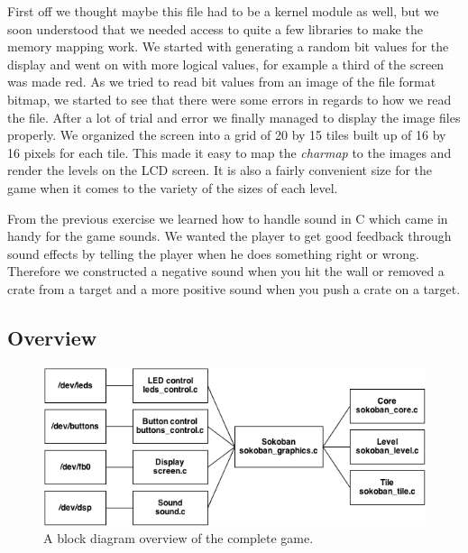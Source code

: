 \documentclass[a4paper,11pt]{article}
\begin{document}
First off we thought maybe this file had to be a kernel module as well, but we soon understood that we needed access to quite a few libraries to make the memory mapping work. We started with generating a random bit values for the display and went on with more logical values, for example a third of the screen was made red. As we tried to read bit values from an image of the file format bitmap, we started to see that there were some errors in regards to how we read the file. After a lot of trial and error we finally managed to display the image files properly. We organized the screen into a grid of 20 by 15 tiles built up of 16 by 16 pixels for each tile. This made it easy to map the \textit{charmap} to the images and render the levels on the LCD screen. It is also a fairly convenient size for the game when it comes to the variety of the sizes of each level.

From the previous exercise we learned how to handle sound in C which came in handy for the game sounds. We wanted the player to get good feedback through sound effects by telling the player when he does something right or wrong. Therefore we constructed a negative sound when you hit the wall or removed a crate from a target and a more positive sound when you push a crate on a target. 

\subsection{Overview}
\begin{figure}[H]
\centering
\includegraphics[scale=0.5]{images/blockdiagram.png}
\caption{A block diagram overview of the complete game.}
\label{fig:blockdiagram}
\end{figure}
\end{document}
